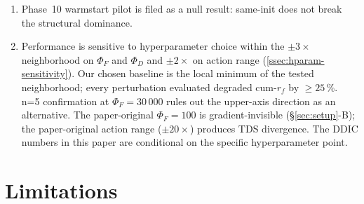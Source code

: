 \documentclass[journal,onecolumn,11pt]{IEEEtran}
\begin{document}
\begin{enumerate}
        qualitative ranking on paper-specific scenarios is preserved.
  \item Phase~10 warmstart pilot is filed as a null result:
        same-init does not break the structural dominance.
  \item Performance is sensitive to hyperparameter choice within the
        $\pm 3\times$ neighborhood on $\Phi_F$ and $\Phi_D$ and
        $\pm 2\times$ on action range
        (\cref{ssec:hparam-sensitivity}). Our chosen baseline is the
        local minimum of the tested neighborhood; every perturbation
        evaluated degraded cum-$r_f$ by $\geq 25\,\%$. n=5 confirmation
        at $\Phi_F = 30\,000$ rules out the upper-axis direction as
        an alternative. The paper-original $\Phi_F = 100$ is
        gradient-invisible (\S\ref{sec:setup}-B); the paper-original
        action range ($\pm 20\times$) produces TDS divergence. The
        DDIC numbers in this paper are conditional on the specific
        hyperparameter point.
\end{enumerate}

\section{Limitations}\label{sec:limits}
\end{document}

